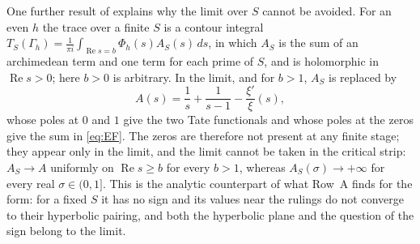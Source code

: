 \documentclass[10pt]{amsart}
\theoremstyle{definition}
\theoremstyle{remark}
\newcommand{\Rel}{\operatorname{Re}}
\begin{document}
One further result of \cite{Paper45} explains why the limit over $S$ cannot be avoided. For an
even $h$ the trace over a finite $S$ is a contour integral
$T_S(\Gamma_h)=\frac1{\pi i}\int_{\Rel s=b}\Phi_h(s)A_S(s)\,ds$, in which $A_S$ is the sum of an
archimedean term and one term for each prime of $S$, and is holomorphic in $\Rel s>0$; here
$b>0$ is arbitrary. In the limit, and for $b>1$, $A_S$ is replaced by
\[
 A(s)=\frac1s+\frac1{s-1}-\frac{\xi'}{\xi}(s),
\]
whose poles at $0$ and $1$ give the two Tate functionals and whose poles at the zeros give the
sum in \eqref{eq:EF}. The zeros are therefore not present at any finite stage; they appear
only in the limit, and the limit cannot be taken in the critical strip: $A_S\to A$ uniformly on
$\Rel s\ge b$ for every $b>1$, whereas $A_S(\sigma)\to+\infty$ for every real $\sigma\in(0,1]$.
This is the analytic counterpart of what Row~A finds for the form: for a fixed $S$ it has no
sign and its values near the rulings do not converge to their hyperbolic pairing, and both the
hyperbolic plane and the question of the sign belong to the limit.
\end{document}
